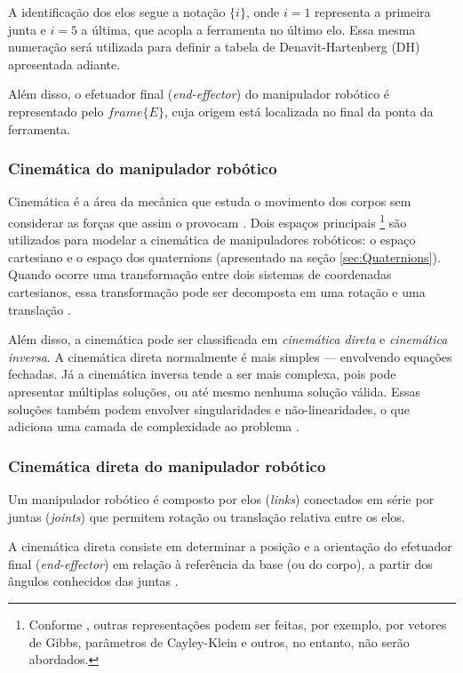A identificação dos elos segue a notação $\{i\}$, onde $i=1$ representa a primeira junta e $i=5$ a última, que acopla a ferramenta no último elo. Essa mesma numeração será utilizada para definir a tabela de Denavit-Hartenberg (DH) apresentada adiante.

Além disso, o efetuador final (\emph{end-effector}) do manipulador robótico é representado pelo $frame \{E\}$, cuja origem está localizada no final da ponta da ferramenta.

\subsubsection{Cinemática do manipulador robótico}
Cinemática é a área da mecânica que estuda o movimento dos corpos sem considerar as forças que assim o provocam \cite{craig2005}.
Dois espaços principais
\footnote{Conforme \cite{kucuk2006robot}, outras representações podem ser feitas, por exemplo, por vetores de Gibbs, parâmetros de Cayley-Klein e outros, no entanto, não serão abordados.}
são utilizados para modelar a cinemática de manipuladores robóticos: o espaço cartesiano e o espaço dos quaternions (apresentado na seção \eqref{sec:Quaternions}). Quando ocorre uma transformação entre dois sistemas de coordenadas cartesianos, essa transformação pode ser decomposta em uma rotação e uma translação \cite{kucuk2006robot}.  

Além disso, a cinemática pode ser classificada em \emph{cinemática direta} e \emph{cinemática inversa}. A cinemática direta normalmente é mais simples — envolvendo equações fechadas. Já a cinemática inversa tende a ser mais complexa, pois pode apresentar múltiplas soluções, ou até mesmo nenhuma solução válida. Essas soluções também podem envolver singularidades e não-linearidades, o que adiciona uma camada de complexidade ao problema \cite{craig2005, kucuk2006robot}.

\subsubsection{Cinemática direta do manipulador robótico}
Um manipulador robótico é composto por elos (\emph{links}) conectados em série por juntas (\emph{joints}) que permitem rotação ou translação relativa entre os elos.  

A cinemática direta consiste em determinar a posição e a orientação do efetuador final (\emph{end-effector}) em relação à referência da base (ou do corpo), a partir dos ângulos conhecidos das juntas \cite{kucuk2006robot}.

